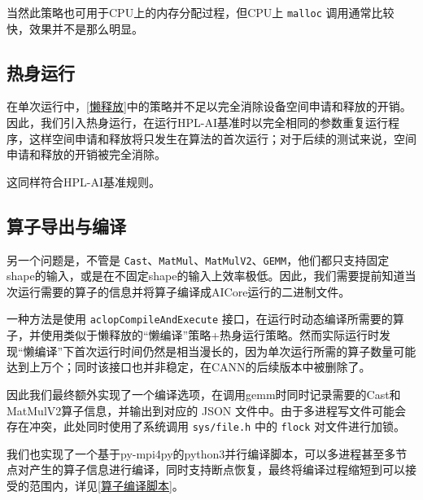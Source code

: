当然此策略也可用于CPU上的内存分配过程，但CPU上 \lstinline{malloc} 调用通常比较快，效果并不是那么明显。

\subsection{热身运行}
\label{热身运行}

在单次运行中，\autoref{懒释放}中的策略并不足以完全消除设备空间申请和释放的开销。因此，我们引入热身运行，在运行HPL-AI基准时以完全相同的参数重复运行程序，这样空间申请和释放将只发生在算法的首次运行；对于后续的测试来说，空间申请和释放的开销被完全消除。

这同样符合HPL-AI基准规则。

\subsection{算子导出与编译}

另一个问题是，不管是 \lstinline{Cast}、\lstinline{MatMul}、\lstinline{MatMulV2}、\lstinline{GEMM}，他们都只支持固定shape的输入，或是在不固定shape的输入上效率极低。因此，我们需要提前知道当次运行需要的算子的信息并将算子编译成AICore运行的二进制文件。

一种方法是使用 \lstinline{aclopCompileAndExecute} 接口，在运行时动态编译所需要的算子，并使用类似于懒释放的``懒编译''策略+热身运行策略。然而实际运行时发现``懒编译''下首次运行时间仍然是相当漫长的，因为单次运行所需的算子数量可能达到上万个；同时该接口也并非稳定，在CANN的后续版本中被删除了。

因此我们最终额外实现了一个编译选项，在调用gemm时同时记录需要的Cast和MatMulV2算子信息，并输出到对应的 JSON 文件中。由于多进程写文件可能会存在冲突，此处同时使用了系统调用 \lstinline{sys/file.h} 中的 \lstinline{flock} 对文件进行加锁。

我们也实现了一个基于py-mpi4py的python3并行编译脚本，可以多进程甚至多节点对产生的算子信息进行编译，同时支持断点恢复，最终将编译过程缩短到可以接受的范围内，详见\autoref{算子编译脚本}。

